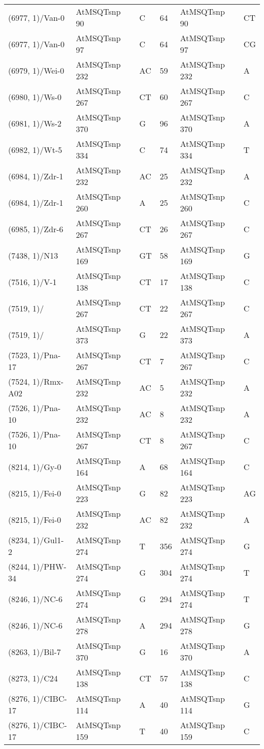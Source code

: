 \begin{center}
\begin{longtable}{|l|l|l|l|l|l|}
(6977, 1)/Van-0&AtMSQTsnp 90&C&64&AtMSQTsnp 90&CT\\
(6977, 1)/Van-0&AtMSQTsnp 97&C&64&AtMSQTsnp 97&CG\\
(6979, 1)/Wei-0&AtMSQTsnp 232&AC&59&AtMSQTsnp 232&A\\
(6980, 1)/Ws-0&AtMSQTsnp 267&CT&60&AtMSQTsnp 267&C\\
(6981, 1)/Ws-2&AtMSQTsnp 370&G&96&AtMSQTsnp 370&A\\
(6982, 1)/Wt-5&AtMSQTsnp 334&C&74&AtMSQTsnp 334&T\\
(6984, 1)/Zdr-1&AtMSQTsnp 232&AC&25&AtMSQTsnp 232&A\\
(6984, 1)/Zdr-1&AtMSQTsnp 260&A&25&AtMSQTsnp 260&C\\
(6985, 1)/Zdr-6&AtMSQTsnp 267&CT&26&AtMSQTsnp 267&C\\
(7438, 1)/N13&AtMSQTsnp 169&GT&58&AtMSQTsnp 169&G\\
(7516, 1)/V-1&AtMSQTsnp 138&CT&17&AtMSQTsnp 138&C\\
(7519, 1)/&AtMSQTsnp 267&CT&22&AtMSQTsnp 267&C\\
(7519, 1)/&AtMSQTsnp 373&G&22&AtMSQTsnp 373&A\\
(7523, 1)/Pna-17&AtMSQTsnp 267&CT&7&AtMSQTsnp 267&C\\
(7524, 1)/Rmx-A02&AtMSQTsnp 232&AC&5&AtMSQTsnp 232&A\\
(7526, 1)/Pna-10&AtMSQTsnp 232&AC&8&AtMSQTsnp 232&A\\
(7526, 1)/Pna-10&AtMSQTsnp 267&CT&8&AtMSQTsnp 267&C\\
(8214, 1)/Gy-0&AtMSQTsnp 164&A&68&AtMSQTsnp 164&C\\
(8215, 1)/Fei-0&AtMSQTsnp 223&G&82&AtMSQTsnp 223&AG\\
(8215, 1)/Fei-0&AtMSQTsnp 232&AC&82&AtMSQTsnp 232&A\\
(8234, 1)/Gul1-2&AtMSQTsnp 274&T&356&AtMSQTsnp 274&G\\
(8244, 1)/PHW-34&AtMSQTsnp 274&G&304&AtMSQTsnp 274&T\\
(8246, 1)/NC-6&AtMSQTsnp 274&G&294&AtMSQTsnp 274&T\\
(8246, 1)/NC-6&AtMSQTsnp 278&A&294&AtMSQTsnp 278&G\\
(8263, 1)/Bil-7&AtMSQTsnp 370&G&16&AtMSQTsnp 370&A\\
(8273, 1)/C24&AtMSQTsnp 138&CT&57&AtMSQTsnp 138&C\\
(8276, 1)/CIBC-17&AtMSQTsnp 114&A&40&AtMSQTsnp 114&G\\
(8276, 1)/CIBC-17&AtMSQTsnp 159&T&40&AtMSQTsnp 159&C\\

\end{longtable}
\end{center}
